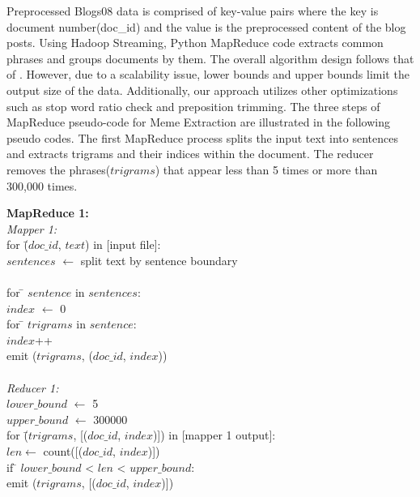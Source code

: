 \documentclass{sig-alternate}
\begin{document}
Preprocessed Blogs08 data is comprised of key-value pairs where the key is document number(doc\_id) and the value is the preprocessed content of the blog posts. Using Hadoop Streaming, Python MapReduce code extracts common phrases and groups documents by them. The overall algorithm design follows that of \cite{Kolak2008}. However, due to a scalability issue, lower bounds and upper bounds limit the output size of the data.  Additionally, our approach utilizes other optimizations such as stop word ratio check and preposition trimming. The three steps of MapReduce pseudo-code for Meme Extraction are illustrated in the following pseudo codes. The first MapReduce process splits the input text into sentences and extracts trigrams and their indices within the document. The reducer removes the phrases($trigrams$) that appear less than 5 times or more than 300,000 times.

\begin{centering}

\begin{tabbing}
\textbf{MapReduce 1:}\\
\emph{Mapper 1:}\\

for \= ($doc\_id$, $text$) in [input file]:\\
\>	$sentences$  $\leftarrow$ split text by sentence boundary\\
\\
\>	for \= $sentence$ in $sentences$:\\
\>\>	$index$ $\leftarrow$ 0\\
\>\>	for \= $trigrams$ in $sentence$:\\
\>\>\>		$index$++	\\
\>\>\>		emit ($trigrams$, ($doc\_id$, $index$))\\
\\
\emph{Reducer 1:}\\
$lower\_bound$  $\leftarrow$ 5\\
$upper\_bound$  $\leftarrow$ 300000\\
for \= ($trigrams$, [($doc\_id$, $index$)]) in [mapper 1 output]:\\
\>	$len \leftarrow$ count([($doc\_id$, $index$)])\\
\> 	if \= $lower\_bound$ < $len$ < $upper\_bound$:\\
\>\>	emit ($trigrams$, [($doc\_id$, $index$)])\\
\end{tabbing}
\end{centering}
\end{document}
